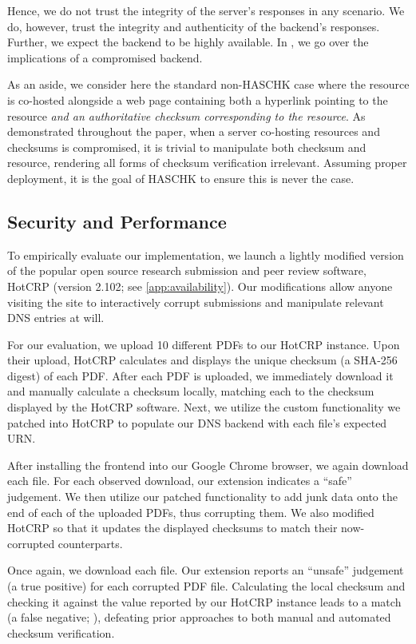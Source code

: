 Hence, we do not trust the integrity of the server's responses in any scenario.
We do, however, trust the integrity and authenticity of the backend's responses.
Further, we expect the backend to be highly available. In
, we go over the implications of a compromised backend.

As an aside, we consider here the standard non-HASCHK case where the resource
is co-hosted alongside a web page containing both a hyperlink pointing to the
resource \emph{and an authoritative checksum corresponding to the resource}. As
demonstrated throughout the paper, when a server co-hosting resources and
checksums is compromised, it is trivial to manipulate both checksum and
resource, rendering all forms of checksum verification irrelevant. Assuming
proper deployment, it is the goal of HASCHK to ensure this is never the case.

\subsection{Security and Performance}

To empirically evaluate our implementation, we launch a lightly modified version
of the popular open source research submission and peer review software, HotCRP
(version 2.102; see \cref{app:availability}). Our modifications allow anyone
visiting the site to interactively corrupt submissions and manipulate relevant
DNS entries at will.

For our evaluation, we upload 10 different PDFs to our HotCRP instance. Upon
their upload, HotCRP calculates and displays the unique checksum (a SHA-256
digest) of each PDF. After each PDF is uploaded, we immediately download it and
manually calculate a checksum locally, matching each to the checksum displayed
by the HotCRP software. Next, we utilize the custom functionality we patched
into HotCRP to populate our DNS backend with each file's expected URN.

After installing the frontend into our Google Chrome browser, we again download
each file. For each observed download, our extension indicates a ``safe''
judgement. We then utilize our patched functionality to add junk data onto the
end of each of the uploaded PDFs, thus corrupting them. We also modified HotCRP
so that it updates the displayed checksums to match their now-corrupted
counterparts.

Once again, we download each file. Our extension reports an ``unsafe'' judgement
(a true positive) for each corrupted PDF file. Calculating the local checksum
and checking it against the value reported by our HotCRP instance leads to a
match (a false negative; ), defeating prior
approaches to both manual and automated checksum verification.

